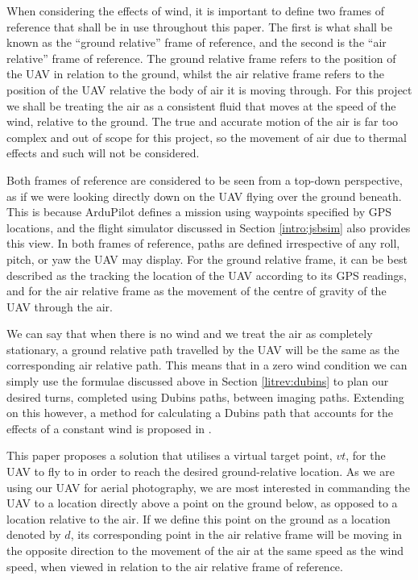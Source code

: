 When considering the effects of wind, it is important to define two frames of reference that shall be in use throughout this paper. The first is what shall be known as the ``ground relative'' frame of reference, and the second is the ``air relative'' frame of reference. The ground relative frame refers to the position of the UAV in relation to the ground, whilst the air relative frame refers to the position of the UAV relative the body of air it is moving through. For this project we shall be treating the air as a consistent fluid that moves at the speed of the wind, relative to the ground. The true and accurate motion of the air is far too complex and out of scope for this project, so the movement of air due to thermal effects and such will not be considered. 

Both frames of reference are considered to be seen from a top-down perspective, as if we were looking directly down on the UAV flying over the ground beneath. This is because ArduPilot defines a mission using waypoints specified by GPS locations, and the flight simulator discussed in Section \ref{intro:jsbsim} also provides this view. In both frames of reference, paths are defined irrespective of any roll, pitch, or yaw the UAV may display. For the ground relative frame, it can be best described as the tracking the location of the UAV according to its GPS readings, and for the air relative frame as the movement of the centre of gravity of the UAV through the air. 

We can say that when there is no wind and we treat the air as completely stationary, a ground relative path travelled by the UAV will be the same as the corresponding air relative path. This means that in a zero wind condition we can simply use the formulae discussed above in Section \ref{litrev:dubins} to plan our desired turns, completed using Dubins paths, between imaging paths. Extending on this however, a method for calculating a Dubins path that accounts for the effects of a constant wind is proposed in \cite{mcgee2005optimal}.

This paper proposes a solution that utilises a virtual target point, $vt$, for the UAV to fly to in order to reach the desired ground-relative location. As we are using our UAV for aerial photography, we are most interested in commanding the UAV to a location directly above a point on the ground below, as opposed to a location relative to the air. If we define this point on the ground as a location denoted by $d$, its corresponding point in the air relative frame will be moving in the opposite direction to the movement of the air at the same speed as the wind speed, when viewed in relation to the air relative frame of reference. 


